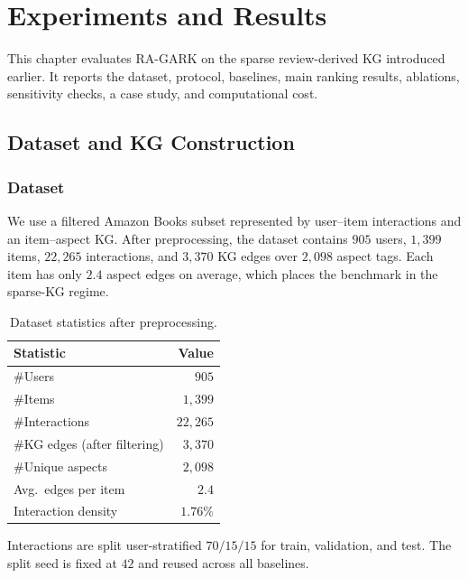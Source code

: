 \chapter{Experiments and Results}
\label{ch:experiments}
\label{ch:evaluation}

\setlength{\tabcolsep}{8pt}

This chapter evaluates RA-GARK on the sparse review-derived KG introduced earlier. It reports the dataset, protocol, baselines, main ranking results, ablations, sensitivity checks, a case study, and computational cost.

\section{Dataset and KG Construction}
\label{sec:eval-dataset}

\subsection{Dataset}
\label{sec:eval-dataset-stats}

We use a filtered Amazon Books subset represented by user--item interactions and an item--aspect KG. After preprocessing, the dataset contains $905$ users, $1{,}399$ items, $22{,}265$ interactions, and $3{,}370$ KG edges over $2{,}098$ aspect tags. Each item has only $2.4$ aspect edges on average, which places the benchmark in the sparse-KG regime.

\begin{table}[H]
\centering
\caption{Dataset statistics after preprocessing.}
\label{tab:dataset-stats}
\begin{tabular}{lr}
\toprule
Statistic & Value \\
\midrule
\#Users                            & $905$ \\
\#Items                            & $1{,}399$ \\
\#Interactions                     & $22{,}265$ \\
\#KG edges (after filtering)       & $3{,}370$ \\
\#Unique aspects                   & $2{,}098$ \\
Avg.\ edges per item               & $2.4$ \\
Interaction density                & $1.76\%$ \\
\bottomrule
\end{tabular}
\end{table}
\FloatBarrier

Interactions are split user-stratified $70/15/15$ for train, validation, and test. The split seed is fixed at $42$ and reused across all baselines.

